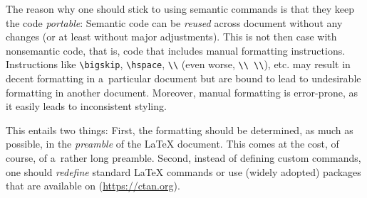 \documentclass[12pt, a4paper, oneside]{article}
\renewcommand{\caps}[1]{{\textscale{0.97}{\textls[50]{\MakeUppercase{#1}}}}}
\theoremstyle{Plain}
\theoremstyle{Definition}
\theoremstyle{Remark}
\begin{document}
The reason why one should stick to using semantic commands is that they keep the code \emph{portable}: Semantic code can be \emph{reused} across document without any changes (or at least without major adjustments). This is not then case with nonsemantic code, that is, code that includes manual formatting instructions. Instructions like \verb|\bigskip|, \verb|\hspace|, \verb|\\| (even worse, \verb|\\ \\|), etc. may result in decent formatting in a~particular document but are bound to lead to undesirable formatting in another document. Moreover, manual formatting is error-prone, as it easily leads to inconsistent styling.

This entails two things: First, the formatting should be determined, as much as possible, in the \emph{preamble} of the LaTeX document. This comes at the cost, of course, of a~rather long preamble. Second, instead of defining custom commands, one should \emph{redefine} standard LaTeX commands or use (widely adopted) packages that are available on \caps{CTAN} (\url{https://ctan.org}).
\end{document}
